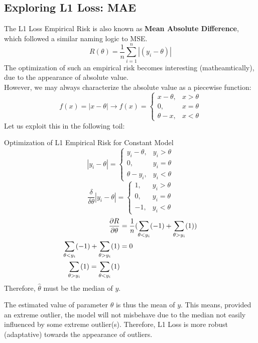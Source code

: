 \subsection{Exploring L1 Loss: MAE}
The L1 Loss Empirical Risk is also known as \textbf{Mean Absolute Difference}, which followed a similar naming logic to MSE. \\
\[R(\theta) = \frac{1}{n} \sum_{i = 1}^n |(y_i - \theta)|\]
The optimization of such an empirical risk becomes interesting (matheamtically), due to the appearance of absolute value. \\
However, we may always characterize the absolute value as a piecewise function:
\[
    f(x) = |x - \theta|
    \rightarrow
    f(x) = 
    \begin{cases}
        x - \theta, &x > \theta \\
        0, &x = \theta \\
        \theta - x, &x < \theta
    \end{cases}
\]
Let us exploit this in the following toil:
\begin{ln-derive}{Optimization of L1 Empirical Risk for Constant Model}{}
    \[
        |y_i - \theta|
         = 
        \begin{cases}
            y_i - \theta, &y_i > \theta \\
            0, &y_i = \theta \\
            \theta - y_i, &y_i < \theta
        \end{cases}
    \]
    \[
        \frac{\delta}{\delta \theta}|y_i - \theta|
        = 
        \begin{cases}
            1, &y_i > \theta \\
            0, &y_i = \theta \\
            -1, &y_i < \theta
        \end{cases}
    \]
    \begin{align*}
        \pdv{R}{\theta}
        &= \frac{1}{n} (\sum_{\theta < y_i}(-1) + \sum_{\theta > y_i}(1)) \\
        \sum_{\theta < y_i}(-1) + \sum_{\theta > y_i}(1) &= 0 \\
        \sum_{\theta > y_i}(1) = \sum_{\theta < y_i}(1)
    \end{align*}
    Therefore, $\hat{\theta}$ must be the median of $y$.
\end{ln-derive}
The estimated value of parameter $\theta$ is thus the mean of $y$. This means, provided an extreme outlier, the model will not misbehave due to the median not easily influenced by some extreme outlier(s). Therefore, L1 Loss is more robust (adaptative) towards the appearance of outliers. \\
